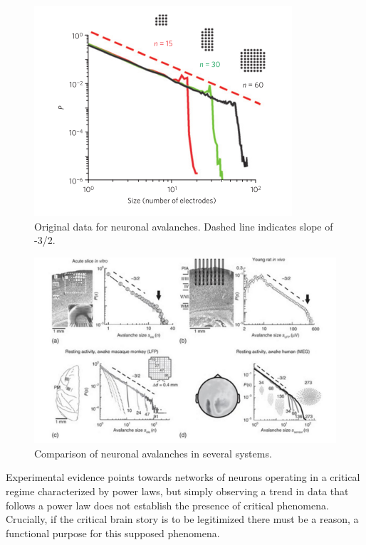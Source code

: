 \documentclass[12pt]{article}
\begin{document}
\begin{figure}      
  \begin{center}    
 \includegraphics[width=.65\textwidth]{originalavalancheplenz}    
    \caption{Original data for neuronal avalanches. Dashed line indicates slope of -3/2. \cite{Beggs2003b}} 
   \label{Figure::Neuronal Avalanches}   
  \end{center}     
   \end{figure}
   
\begin{figure}      
  \begin{center}    
 \includegraphics[width=.90\textwidth]{avalanchesplenzbook}    
    \caption{Comparison of neuronal avalanches in several systems.\cite{Plenz2014}}
   \label{Figure::Neuronal avalanches in vitro and in vivo}   
  \end{center}     
   \end{figure}

Experimental evidence points towards networks of neurons operating in a critical regime characterized by power laws, but simply observing a trend in data that follows a power law does not establish the presence of critical phenomena. Crucially, if the critical brain story is to be legitimized there must be a reason, a functional purpose for this supposed phenomena.   
      
\end{document}
